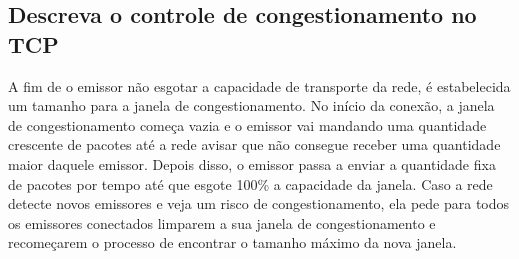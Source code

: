 \subsection{Descreva o controle de congestionamento no TCP}

A fim de o emissor não esgotar a capacidade de transporte da rede, é estabelecida
um tamanho para a janela de congestionamento. No início da conexão, a janela de
congestionamento começa vazia e o emissor vai mandando uma quantidade
crescente de pacotes até a rede avisar que não consegue receber uma quantidade
maior daquele emissor. Depois disso, o emissor passa a enviar a quantidade fixa de
pacotes por tempo até que esgote 100\% a capacidade da janela. 
Caso a rede detecte novos emissores e veja um risco de
congestionamento, ela pede para todos os emissores conectados limparem a sua janela de
congestionamento e recomeçarem o processo de encontrar o tamanho máximo da nova janela.